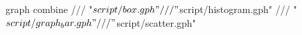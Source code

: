 graph combine ///
        "$script/box.gph" ///
        "$script/histogram.gph" ///     
        "$script/graph_bar.gph" ///
        "$script/scatter.gph"
